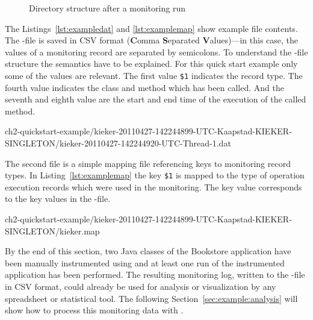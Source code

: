 \begin{figure}[H]
\begin{graybox}
\end{graybox}
\caption{Directory structure after a monitoring run}
\label{fig:logtree}
\end{figure}

\enlargethispage{1.5cm}

The Listings~\ref{lst:exampledat} and \ref{lst:examplemap} show example file contents. The -file is saved in CSV format (\textbf{C}omma \textbf{S}eparated \textbf{V}alues)---in this case, the values of a monitoring record are separated by semicolons. To understand the -file structure the semantics have to be explained. For this quick start example only some of the values are relevant. The first value \verb!$1! indicates the record type. The fourth value indicates the class and method which has been called. And the seventh and eighth value are the start and end time of the execution of the called method.

\setBashListing
%
{ch2-quickstart-example/kieker-20110427-142244899-UTC-Kaapstad-KIEKER-SINGLETON/kieker-20110427-142244920-UTC-Thread-1.dat}

\noindent The second file is a simple mapping file referencing keys to monitoring record types. In Listing~\ref{lst:examplemap} the key \verb!$1! is mapped to the type of operation execution records which were used in the monitoring. The key value corresponds to the key values in the -file.

%
{ch2-quickstart-example/kieker-20110427-142244899-UTC-Kaapstad-KIEKER-SINGLETON/kieker.map}

\noindent By the end of this section, two Java classes of the Bookstore application %
have been manually instrumented using \KiekerMonitoringPart{} and at least one %
run of the instrumented application has been performed. %
The resulting monitoring log, written to the -file in CSV format, could %
already be used for analysis or visualization by any spreadsheet or %
statistical tool. %
The following Section~\ref{sec:example:analysis} will show how to process %
this monitoring data with \KiekerAnalysisPart{}. 

